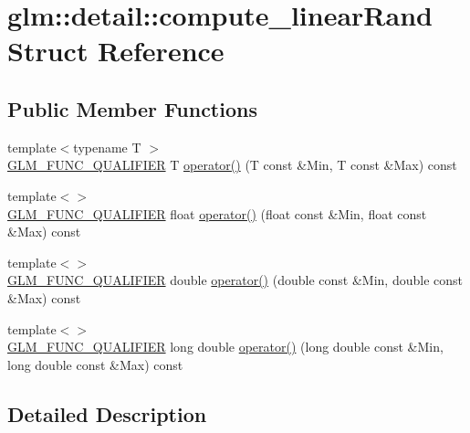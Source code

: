 \hypertarget{structglm_1_1detail_1_1compute__linear_rand}{}\section{glm\+:\+:detail\+:\+:compute\+\_\+linear\+Rand Struct Reference}
\label{structglm_1_1detail_1_1compute__linear_rand}
\subsection*{Public Member Functions}
\begin{DoxyCompactItemize}
\item 
{\footnotesize template$<$typename T $>$ }\\\hyperlink{setup_8hpp_a33fdea6f91c5f834105f7415e2a64407}{G\+L\+M\+\_\+\+F\+U\+N\+C\+\_\+\+Q\+U\+A\+L\+I\+F\+I\+ER} T \hyperlink{structglm_1_1detail_1_1compute__linear_rand_a8bdfdda9918e9353db9c32adc79a5c5c}{operator()} (T const \&Min, T const \&Max) const
\item 
{\footnotesize template$<$$>$ }\\\hyperlink{setup_8hpp_a33fdea6f91c5f834105f7415e2a64407}{G\+L\+M\+\_\+\+F\+U\+N\+C\+\_\+\+Q\+U\+A\+L\+I\+F\+I\+ER} float \hyperlink{structglm_1_1detail_1_1compute__linear_rand_af2111416ac6f865878fd3b76e67b84e0}{operator()} (float const \&Min, float const \&Max) const
\item 
{\footnotesize template$<$$>$ }\\\hyperlink{setup_8hpp_a33fdea6f91c5f834105f7415e2a64407}{G\+L\+M\+\_\+\+F\+U\+N\+C\+\_\+\+Q\+U\+A\+L\+I\+F\+I\+ER} double \hyperlink{structglm_1_1detail_1_1compute__linear_rand_ad45fc4e214a3d1666353c3b800b397d3}{operator()} (double const \&Min, double const \&Max) const
\item 
{\footnotesize template$<$$>$ }\\\hyperlink{setup_8hpp_a33fdea6f91c5f834105f7415e2a64407}{G\+L\+M\+\_\+\+F\+U\+N\+C\+\_\+\+Q\+U\+A\+L\+I\+F\+I\+ER} long double \hyperlink{structglm_1_1detail_1_1compute__linear_rand_a8d1b547abeceffe6d4566da1c68a28c8}{operator()} (long double const \&Min, long double const \&Max) const
\end{DoxyCompactItemize}


\subsection{Detailed Description}


